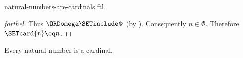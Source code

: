 \documentclass{naproche-library}
\begin{document}
\begin{smodule}[title=Natural Numbers are Cardinal Numbers]{natural-numbers-are-cardinals.ftl}
\begin{proof}[forthel]
  Thus $\ORDomega \SETinclude \Phi$ (by ).
  Consequently $n \in \Phi$.
  Therefore $\SETcard{n} \eq n$.
\end{proof}

\begin{corollary}[forthel,id=SET_THEORY_07_7061392098066432]
  Every natural number is a cardinal.
\end{corollary}
\end{smodule}
\end{document}
